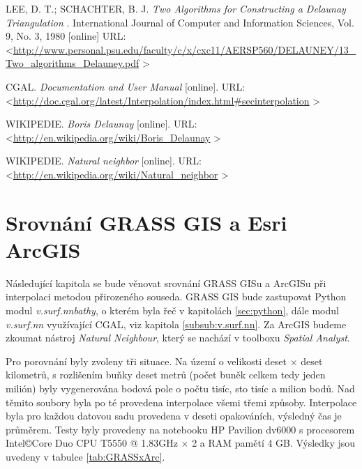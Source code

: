 \documentclass[12pt,a4paper]{article}
\begin{document}
\begin{thebibliography}{99}
LEE, D. T.; SCHACHTER, B. J. \textit{Two Algorithms for Constructing a Delaunay Triangulation }. 
International Journal of Computer and Information Sciences, Vol. 9, No. 3, 1980 [online]
URL: \textless\url{http://www.personal.psu.edu/faculty/c/x/cxc11/AERSP560/DELAUNEY/13_Two_algorithms_Delauney.pdf}
\textgreater

CGAL. \textit{Documentation and User Manual} [online].
URL: \textless\url{http://doc.cgal.org/latest/Interpolation/index.html#secinterpolation}
\textgreater

WIKIPEDIE. \textit{Boris Delaunay} [online].
URL: \textless\url{http://en.wikipedia.org/wiki/Boris_Delaunay}
\textgreater

WIKIPEDIE. \textit{Natural neighbor} [online].
URL: \textless\url{http://en.wikipedia.org/wiki/Natural_neighbor}
\textgreater
\end{thebibliography}



\appendix
\newpage
\section{Srovnání GRASS GIS a Esri ArcGIS}
\label{app:srovnani}

Následující kapitola se bude věnovat srovnání GRASS GISu a ArcGISu při
interpolaci metodou přirozeného souseda. GRASS GIS bude zastupovat
Python modul \emph{v.surf.nnbathy}, o kterém byla řeč v 
kapitolách \ref{sec:python}, dále modul \emph{v.surf.nn} využívající CGAL, viz kapitola \ref{subsub:v.surf.nn}. Za ArcGIS budeme zkoumat nástroj \emph{Natural Neighbour},
který se nachází v toolboxu \emph{Spatial Analyst}.

Pro porovnání byly zvoleny tři situace. Na území o velikosti deset
$\times$ deset kilometrů, s rozlišením buňky deset metrů (počet buněk celkem tedy jeden milión)
byly vygenerována
bodová pole o počtu tisíc, sto tisíc a milion bodů. Nad těmito soubory
byla po té provedena interpolace všemi třemi způsoby. Interpolace byla
pro každou datovou sadu provedena v deseti opakováních, výsledný čas
je průměrem. Testy byly provedeny na notebooku HP Pavilion dv6000 s
procesorem Intel\copyright Core Duo CPU T5550 @
1.83GHz $\times$ 2 a RAM pamětí 4 GB. Výsledky jsou uvedeny v tabulce
\ref{tab:GRASSxArc}.

\end{document}

